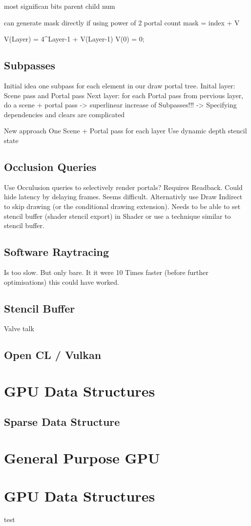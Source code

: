 most significan bits parent child num

can generate mask directly if using power of 2 portal count
mask = index + V

V(Layer) = 4^{Layer-1} + V(Layer-1)
V(0) = 0;

\subsection{Subpasses}
Initial idea one subpass for each element in our draw portal tree.
Inital layer: Scene pass and Portal pass
Next layer: for each Portal pass from pervious layer, do a scene + portal pass
-> superlinear increase of Subpasses!!!
-> Specifying dependencies and clears are complicated

New approach
One Scene + Portal pass for each layer
Use dynamic depth stencil state


\subsection{Occlusion Queries}
Use Occulusion queries to selectively render portals? Requires Readback. Could hide latency by delaying frames. Seems difficult.
Alternativly use Draw Indirect to skip drawing (or the conditional drawing extension). Needs to be able to set stencil buffer (shader stencil export) in Shader or use a technique similar to stencil buffer.


\subsection{Software Raytracing}
Is too slow. But only bare. It it were 10 Times faster (before further optimisations) this could have worked.


\subsection{Stencil Buffer}
Valve talk

\subsection{Open CL / Vulkan}
\section{GPU Data Structures}
\subsection{Sparse Data Structure}

\section{General Purpose GPU}

\section{GPU Data Structures}

test \cite{Heuser:2003}